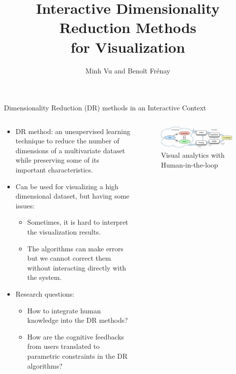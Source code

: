 \documentclass{beamer}
\author[vuvietminh@unamur.be]{Minh Vu and Benoît Frénay}
\title{Interactive Dimensionality Reduction Methods\\for Visualization}
\begin{document}
\begin{frame}[fragile]\centering


\begin{block}{Dimensionality Reduction (DR) methods in an Interactive Context}
  \begin{columns}[T]

      \begin{column}{.6\textwidth}
        \begin{itemize}
            \item DR method: an {\color{blue} unsupervised learning} technique
            to reduce the number of dimensions of a multivariate dataset
            while preserving some of its important characteristics.
            \item Can be used for {\color{blue}visualizing a high dimensional dataset}, but having some issues:
            \begin{itemize} \normalsize
                \item Sometimes, it is hard to interpret the visualization results.
                \item The algorithms can make errors but we cannot correct them without interacting directly with the system.
              \end{itemize}
            \item Research questions:
              \begin{itemize} \normalsize
                \item How to {\color{Zen} integrate human knowledge} into the DR methods?
                \item How are {\color{Zen} the cognitive feedbacks from users translated to parametric constraints} in the DR algorithms?
              \end{itemize}
        \end{itemize}
      \end{column}

      \begin{column}{.4\textwidth}
        \begin{figure}[h!]
            \includegraphics[width=\linewidth]{ml_with_human}
            \caption{Visual analytics with Human-in-the-loop \cite{sacha2014knowledge,Sacha2017Interaction}}
            \label{fig:pca:stat:move}    
        \end{figure}
      \end{column}


\end{columns}
\end{block}
\end{frame}
\end{document}

